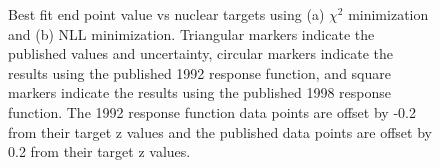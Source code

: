 \begin{figure}[h]
  \centering
  \hfill
  \caption{Best fit end point value vs nuclear targets using (a) $\chi^2$ minimization and (b) NLL minimization.
    Triangular markers indicate the published values and uncertainty, circular markers indicate the results
    using the published 1992 response function, and square markers indicate the results using the published
    1998 response function. The 1992 response function data points are offset by -0.2 from their target z values
    and the published data points are offset by 0.2 from their target z values.
  }
\end{figure}
